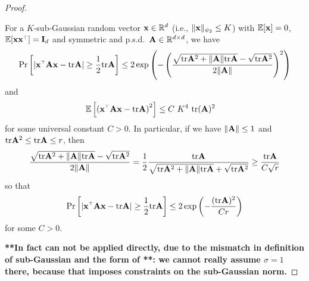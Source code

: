 \documentclass[11pt]{article}
\begin{document}
\begin{proof}
\begin{lemma} \label{l:concentration-sub-gaussian}
For a $K$-sub-Gaussian random vector $\mathbf x \in \mathbb R^d$ (i.e., $\| \mathbf x \|_{\psi_2} \leq K$) with $\mathbb E[\mathbf x] = 0$, $\E[\x \x^\top] = \I_d$ and symmetric and p.s.d.~$\mathbf A \in \mathbb R^{d \times d}$, we have
\begin{align*}
  \Pr\left[
    \lvert \x^\top \A \x - \tr \A \rvert
    \geq \frac12 \tr \A
    \right] \leq 2 \exp\left( - \left(  \frac{ \sqrt{  \tr \A^2 + \| \A \| \tr \A } - \sqrt{\tr \A^2} }{2 \| \A \|} \right)^2 \right) 
\end{align*}
and 
\begin{align*}
  \E\left[ \left( \x^\top \A \x - \tr \A \right)^2 \right]
  &\leq C~K^4~\tr(\A)^2
\end{align*}
for some universal constant $C>0$. In particular, if we have $\| \mathbf A \| \le 1$ and $\mathrm{tr} \mathbf A^2 \le \mathrm{tr} \mathbf A \le r$, then
\[
  \frac{ \sqrt{  \mathrm{tr} \mathbf A^2 + \| \mathbf A \| \mathrm{tr} \mathbf A } - \sqrt{\mathrm{tr} \mathbf A^2} }{2 \| \mathbf A \|} = \frac12 \frac{ \mathrm{tr} \mathbf A }{\sqrt{  \mathrm{tr} \mathbf A^2 + \| \mathbf A \| \mathrm{tr} \mathbf A } + \sqrt{\mathrm{tr} \mathbf A^2} } \ge \frac{\mathrm{tr} \mathbf A}{C \sqrt r}
\]
so that
\[
  \Pr\left[
    \lvert \x^\top \A \x - \tr \A \rvert
    \geq \frac12 \tr \A
    \right] \leq 2 \exp\left( - \frac{(\tr \A)^2}{C r} \right)
\]
for some $C > 0$.
\end{lemma}

\textbf{**In fact \cite[Theorem~2.1]{hsu2012tail} can not be applied directly, due to the mismatch in definition of sub-Gaussian and the form of \cite[Theorem~2.1]{hsu2012tail}**: we cannot really assume $\sigma = 1$ there, because that imposes constraints on the sub-Gaussian norm.}



\end{proof}
\end{document}
